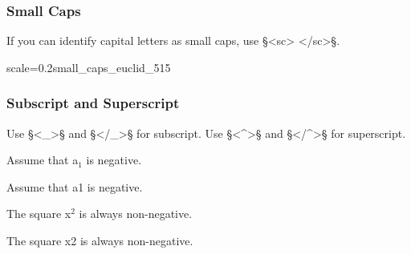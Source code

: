 \subsubsection{Small Caps}
\label{section small caps}

\begin{mainrule}
If you can identify capital letters as small caps, use §<sc> </sc>§.
\end{mainrule}

\vspace{3mm}
\begin{sampleImageSmall}{scale=0.2}{small_caps_euclid_515}


\end{sampleImageSmall}


\subsubsection{Subscript and Superscript}
\label{section subscript and superscript}

\begin{mainrule}
Use §<_>§ and §</_>§ for subscript. Use §<^>§ and §</^>§ for superscript.
\end{mainrule}

\begin{example}[ 1: \, subscript]

\vspace{-4mm}
Assume that a$_1$ is negative.
\begin{typeLatin}
Assume that a\bold{<_>}1\bold{</_>} is negative.
\end{typeLatin}
\end{example}

\begin{example}[ 2: \, superscript]

\vspace{-4mm}
The square x$^2$ is always non-negative.
\begin{typeLatin}
The square x\bold{<^>}2\bold{</^>} is always non-negative.
\end{typeLatin}
\end{example}


